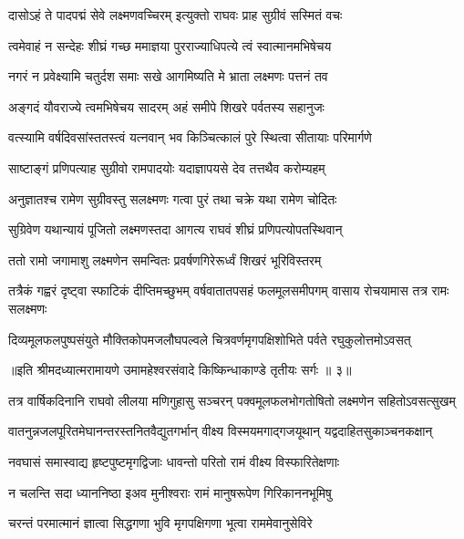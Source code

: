 \twolineshloka
{दासोऽहं ते पादपद्मं सेवे लक्ष्मणवच्चिरम्}
{इत्युक्तो राघवः प्राह सुग्रीवं सस्मितं वचः} %

\twolineshloka
{त्वमेवाहं न सन्देहः शीघ्रं गच्छ ममाज्ञया}
{पुरराज्याधिपत्ये त्वं स्वात्मानमभिषेचय} %

\twolineshloka
{नगरं न प्रवेक्ष्यामि चतुर्दश समाः सखे}
{आगमिष्यति मे भ्राता लक्ष्मणः पत्तनं तव} %

\twolineshloka
{अङ्गदं यौवराज्ये त्वमभिषेचय सादरम्}
{अहं समीपे शिखरे पर्वतस्य सहानुजः} %

\twolineshloka
{वत्स्यामि वर्षदिवसांस्ततस्त्वं यत्नवान् भव}
{किञ्चित्कालं पुरे स्थित्वा सीतायाः परिमार्गणे} %

\twolineshloka
{साष्टाङ्गं प्रणिपत्याह सुग्रीवो रामपादयोः}
{यदाज्ञापयसे देव तत्तथैव करोम्यहम्} %

\twolineshloka
{अनुज्ञातश्च रामेण सुग्रीवस्तु सलक्ष्मणः}
{गत्वा पुरं तथा चक्रे यथा रामेण चोदितः} %

\twolineshloka
{सुग्रिवेण यथान्यायं पूजितो लक्ष्मणस्तदा}
{आगत्य राघवं शीघ्रं प्रणिपत्योपतस्थिवान्} %

\twolineshloka
{ततो रामो जगामाशु लक्ष्मणेन समन्वितः}
{प्रवर्षणगिरेरूर्ध्वं शिखरं भूरिविस्तरम्} %

\threelineshloka
{तत्रैकं गह्वरं दृष्ट्वा स्फाटिकं दीप्तिमच्छुभम्}
{वर्षवातातपसहं फलमूलसमीपगम्}
{वासाय रोचयामास तत्र रामः सलक्ष्मणः} %

\twolineshloka
{दिव्यमूलफलपुष्पसंयुते मौक्तिकोपमजलौघपल्वले}
{चित्रवर्णमृगपक्षिशोभिते पर्वते रघुकुलोत्तमोऽवसत्} %

{॥इति श्रीमदध्यात्मरामायणे उमामहेश्वरसंवादे किष्किन्धाकाण्डे
तृतीयः सर्गः ॥ ३॥
}




\twolineshloka
{तत्र वार्षिकदिनानि राघवो लीलया मणिगुहासु सञ्चरन्}
{पक्वमूलफलभोगतोषितो लक्ष्मणेन सहितोऽवसत्सुखम्} %

\twolineshloka
{वातनुन्नजलपूरितमेघानन्तरस्तनितवैद्युतगर्भान्}
{वीक्ष्य विस्मयमगाद्गजयूथान् यद्वदाहितसुकाञ्चनकक्षान्} %

\twolineshloka
{नवघासं समास्वाद्य हृष्टपुष्टमृगद्विजाः}
{धावन्तो परितो रामं वीक्ष्य विस्फारितेक्षणाः} %

\twolineshloka
{न चलन्ति सदा ध्याननिष्ठा इअव मुनीश्वराः}
{रामं मानुषरूपेण गिरिकाननभूमिषु} %

\twolineshloka
{चरन्तं परमात्मानं ज्ञात्वा सिद्धगणा भुवि}
{मृगपक्षिगणा भूत्वा राममेवानुसेविरे} %

